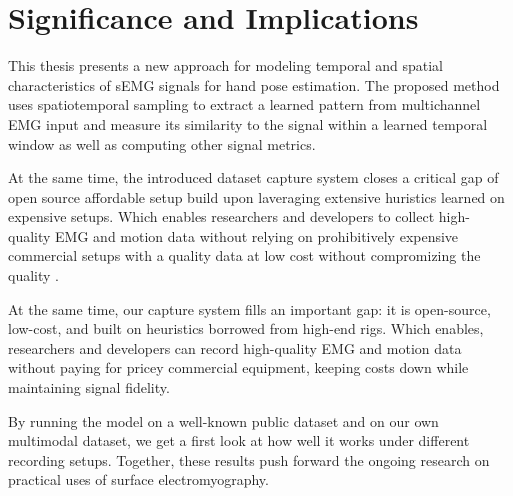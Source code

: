 \section{Significance and Implications}

This thesis presents a new approach for modeling temporal and spatial characteristics of sEMG signals for hand pose estimation. The proposed method uses spatiotemporal sampling to extract a learned pattern from multichannel EMG input and measure its similarity to the signal within a learned temporal window as well as computing other signal metrics.

At the same time, the introduced dataset capture system closes a critical gap of open source affordable setup build upon laveraging extensive huristics learned on expensive setups. Which enables researchers and developers to collect high-quality EMG and motion data without relying on prohibitively expensive commercial setups with a quality data at low cost without compromizing the quality \cite{quivira2018translating}.

At the same time, our capture system fills an important gap: it is open-source, low-cost, and built on heuristics borrowed from high-end rigs. Which enables, researchers and developers can record high-quality EMG and motion data without paying for pricey commercial equipment, keeping costs down while maintaining signal fidelity.

By running the model on a well-known public dataset and on our own multimodal dataset, we get a first look at how well it works under different recording setups. Together, these results push forward the ongoing research on practical uses of surface electromyography.
